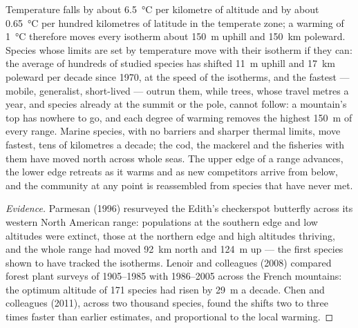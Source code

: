 \begin{proposition}\label{prop:b2:global-change:range}
Temperature falls by about \qty{6.5}{\celsius} per kilometre of
altitude and by about \qty{0.65}{\celsius} per hundred kilometres of
latitude in the temperate zone; a warming of \qty{1}{\celsius}
therefore moves every isotherm about \qty{150}{m} uphill and
\qty{150}{km} poleward. Species whose limits are set by temperature
move with their isotherm if they can: the average of hundreds of
studied species has shifted \qty{11}{m} uphill and \qty{17}{km}
poleward per decade since 1970, at the speed of the isotherms, and
the fastest --- mobile, generalist, short-lived --- outrun them,
while trees, whose  travel metres a year, and species already
at the summit or the pole, cannot follow: a mountain's top has
nowhere to go, and each degree of warming removes the highest
\qty{150}{m} of every range. Marine species, with no barriers and
sharper thermal limits, move fastest, tens of kilometres a decade;
the cod, the mackerel and the fisheries with them have moved north
across whole seas. The upper edge of a range advances, the lower
edge retreats as it warms and as new competitors arrive from
below, and the community at any point is reassembled from species
that have never met.
\end{proposition}
\begin{proof}[Evidence]
Parmesan (1996) resurveyed the Edith's checkerspot butterfly
across its western North American range: populations at the
southern edge and low altitudes were extinct, those at the northern
edge and high altitudes thriving, and the whole range had moved
\qty{92}{km} north and \qty{124}{m} up --- the first species shown
to have tracked the isotherms. Lenoir and colleagues (2008)
compared forest plant surveys of 1905--1985 with 1986--2005 across
the French mountains: the optimum altitude of 171 species had
risen by \qty{29}{m} a decade. Chen and colleagues (2011), across
two thousand species, found the shifts two to three times faster
than earlier estimates, and proportional to the local warming.
\end{proof}

